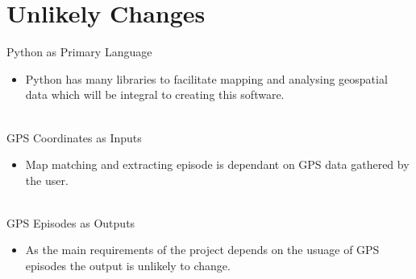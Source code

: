 \documentclass[12pt, titlepage]{article}
\begin{document}
\section{Unlikely Changes}

Python as Primary Language
\begin{itemize}
\item Python has many libraries to facilitate mapping and analysing geospatial data which will be integral to creating this software. 
\end{itemize}
\\
GPS Coordinates as Inputs
\begin{itemize}
\item Map matching and extracting episode is dependant on GPS data gathered by the user. 
\end{itemize}
\\
GPS Episodes as Outputs 
\begin{itemize}
\item As the main requirements of the project depends on the usuage of GPS episodes the output is unlikely to change.
\end{itemize}
\end{document}
